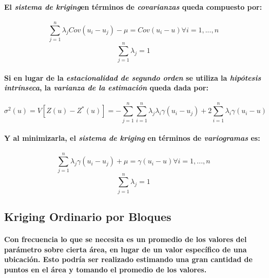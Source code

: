 \paragraph*{
El \emph{sistema de kriging}\footnotemark[23] en términos de \emph{covarianzas} queda compuesto por:
}
\begin{equation}
\sum_{j=1}^n \lambda_j Cov(u_i - u_j) - \mu = Cov(u_i - u) \forall i = 1,...,n
\end{equation}
\begin{equation}
\sum_{j=1}^n \lambda_j = 1
\end{equation}
\paragraph{
Si en lugar de la \emph{estacionalidad de segundo orden} se utiliza la \emph{hipótesis intrínseca}, la \emph{varianza de la estimación} queda dada por:
}
\begin{equation}
\sigma^2(u) = V[Z(u) - Z^*(u)] = -\sum_{j=1}^n\sum_{i=1}^n \lambda_j\lambda_i \gamma(u_i - u_j) + 2 \sum_{i=1}^n \lambda_i \gamma(u_i - u)
\end{equation}
\paragraph{
Y al minimizarla, el \emph{sistema de kriging} en términos de \emph{variogramas} es:
}
\begin{equation}
\sum_{j=1}^n \lambda_j \gamma(u_i - u_j) + \mu = \gamma(u_i - u) \forall i = 1,...,n
\end{equation}
\begin{equation}
\sum_{j=1}^n \lambda_j = 1
\end{equation}


\subsection{Kriging Ordinario por Bloques}
\paragraph{
Con frecuencia lo que se necesita es un promedio de los valores del parámetro sobre cierta área, en lugar de un valor específico de una ubicación. Esto podría ser realizado estimando una gran cantidad de puntos en el área y tomando el promedio de los valores.
}
